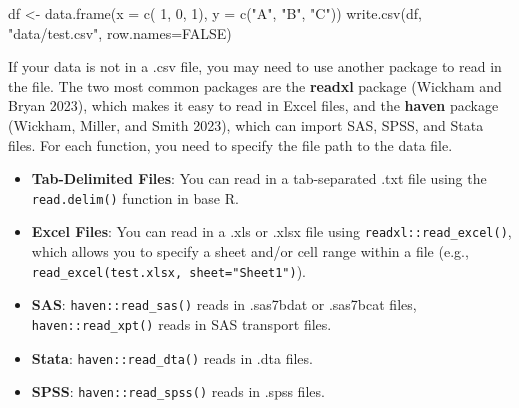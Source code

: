 \documentclass[
  letterpaper,
]{latex/krantz}
\makeatletter
\newenvironment{Shaded}{\begin{snugshade}}{\end{snugshade}}
\newcommand{\AttributeTok}[1]{\textcolor[rgb]{0.40,0.45,0.13}{#1}}
\newcommand{\ConstantTok}[1]{\textcolor[rgb]{0.56,0.35,0.01}{#1}}
\newcommand{\DecValTok}[1]{\textcolor[rgb]{0.68,0.00,0.00}{#1}}
\newcommand{\FunctionTok}[1]{\textcolor[rgb]{0.28,0.35,0.67}{#1}}
\newcommand{\NormalTok}[1]{\textcolor[rgb]{0.00,0.23,0.31}{#1}}
\newcommand{\OtherTok}[1]{\textcolor[rgb]{0.00,0.23,0.31}{#1}}
\newcommand{\StringTok}[1]{\textcolor[rgb]{0.13,0.47,0.30}{#1}}
\newenvironment{kframe}{%
\medskip{}
\setlength{\fboxsep}{.8em}
 \def\at@end@of@kframe{}%
 \ifinner\ifhmode%
  \def\at@end@of@kframe{\end{minipage}}%
  \begin{minipage}{\columnwidth}%
 \fi\fi%
 \def\FrameCommand##1{\hskip\@totalleftmargin \hskip-\fboxsep
 \colorbox{shadecolor}{##1}\hskip-\fboxsep
     \hskip-\linewidth \hskip-\@totalleftmargin \hskip\columnwidth}%
 \MakeFramed {\advance\hsize-\width
   \@totalleftmargin\z@ \linewidth\hsize
   \@setminipage}}%
 {\par\unskip\endMakeFramed%
 \at@end@of@kframe}
\renewenvironment{Shaded}{\begin{kframe}}{\end{kframe}}
\makeatother
\begin{document}
\begin{Shaded}
\begin{Highlighting}[]
\NormalTok{df }\OtherTok{\textless{}{-}} \FunctionTok{data.frame}\NormalTok{(}\AttributeTok{x =} \FunctionTok{c}\NormalTok{( }\DecValTok{1}\NormalTok{, }\DecValTok{0}\NormalTok{, }\DecValTok{1}\NormalTok{), }\AttributeTok{y =} \FunctionTok{c}\NormalTok{(}\StringTok{"A"}\NormalTok{, }\StringTok{"B"}\NormalTok{, }\StringTok{"C"}\NormalTok{))}
\FunctionTok{write.csv}\NormalTok{(df, }\StringTok{"data/test.csv"}\NormalTok{, }\AttributeTok{row.names=}\ConstantTok{FALSE}\NormalTok{)}
\end{Highlighting}
\end{Shaded}

If your data is not in a .csv file, you may need to use another package
to read in the file. The two most common packages are the
\textbf{readxl} package (Wickham and Bryan
2023), which makes it easy to read in Excel files, and the
\textbf{haven} package (Wickham, Miller, and
Smith 2023), which can import SAS, SPSS, and Stata files. For each
function, you need to specify the file path to the data file.

\begin{itemize}
\item
  \textbf{Tab-Delimited Files}: You can read in a tab-separated .txt
   file using the
  \texttt{read.delim()}
  function in base R.
\item
  \textbf{Excel Files}: You can read in a .xls 
  or .xlsx file  using
  \texttt{readxl::read\_excel()},
  which allows you to specify a sheet and/or cell range within a file
  (e.g.,
  \texttt{read\_excel(\textquotesingle{}test.xlsx\textquotesingle{},\ sheet="Sheet1")}).
\item
  \textbf{SAS}:
  \texttt{haven::read\_sas()}
  reads in .sas7bdat or .sas7bcat
  files, \texttt{haven::read\_xpt()}
  reads in SAS transport files.
\item
  \textbf{Stata}:
  \texttt{haven::read\_dta()}
  reads in .dta files.
\item
  \textbf{SPSS}:
  \texttt{haven::read\_spss()}
  reads in .spss files.
\end{itemize}
\end{document}
